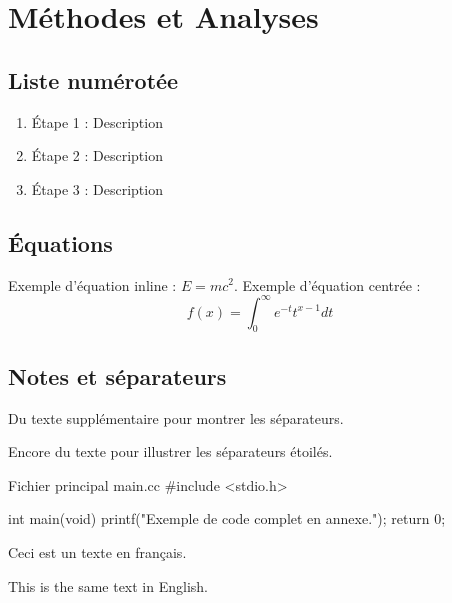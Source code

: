 \documentclass[11pt]{rapport}
\begin{document}
\section{Méthodes et Analyses}

\subsection{Liste numérotée}

\begin{enumerate}
    \item Étape 1 : Description
    \item Étape 2 : Description
    \item Étape 3 : Description
\end{enumerate}

\subsection{Équations}

Exemple d'équation inline : \(E=mc^2\).  
Exemple d'équation centrée :
\[
f(x) = \int_0^\infty e^{-t} t^{x-1} dt
\]

\subsection{Notes et séparateurs}
\sepline

Du texte supplémentaire pour montrer les séparateurs.

\sepstars

Encore du texte pour illustrer les séparateurs étoilés.

\clearemptydoublepage

\appendix

\begin{code}{Fichier principal main.c}{c}
#include <stdio.h>

int main(void) {
    printf("Exemple de code complet en annexe.\n");
    return 0;
}
\end{code}

\lipsum[1-3]

Ceci est un texte en français.

This is the same text in English. %
\end{document}
